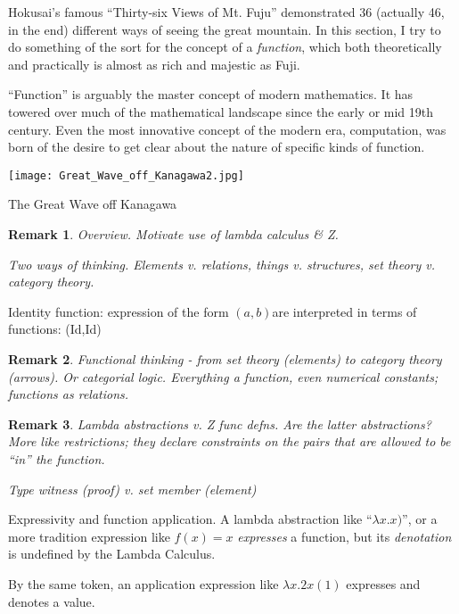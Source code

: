\documentclass[12pt]{tufte-handout}
\numberwithin{equation}{subsection}
\numberwithin{equation}{subsection}
\newtheorem{remark}{Remark}
\newcommand\ab{\((a,b)\)}
\begin{document}
  Hokusai's famous ``Thirty-six Views of Mt. Fuju'' demonstrated 36
  (actually 46, in the end) different ways of seeing the great
  mountain.  In this section, I try to do something of the sort for
  the concept of a \textit{function}, which both theoretically and
  practically is almost as rich and majestic as Fuji.

  ``Function'' is arguably the master concept of modern mathematics.
  It has towered over much of the mathematical landscape since the
  early or mid 19th century.  Even the most innovative concept of the
  modern era, computation, was born of the desire to get clear about
  the nature of specific kinds of function.


  \begin{marginfigure}%
    \centering
    \texttt{[image: Great\_Wave\_off\_Kanagawa2.jpg]}
    \caption{The Great Wave off Kanagawa}
  \end{marginfigure}

  \begin{remark}
    Overview.  Motivate use of lambda calculus \& Z.

    Two ways of thinking.  Elements v. relations, things v. structures,
    set theory v. category theory.
  \end{remark}

  Identity function: expression of the form \ab are interpreted in terms
  of functions: (Id,Id)

  \begin{remark}
    Functional thinking - from set theory (elements) to category theory
    (arrows).  Or categorial logic.  Everything a function, even
    numerical constants; functions as relations.
  \end{remark}

  \begin{remark}
    Lambda abstractions v. Z func defns.  Are the latter abstractions?
    More like restrictions; they declare constraints on the pairs that
    are allowed to be ``in'' the function.

    Type witness (proof) v. set member (element)
  \end{remark}

  Expressivity and function application.  A lambda abstraction like
  ``\(\lambda x.x)\)'', or a more tradition expression like \(f(x) = x\)
  \textit{expresses} a function, but its \textit{denotation} is
  undefined by the Lambda Calculus.

  By the same token, an application expression like \(\lambda x.2x(1)\)
  expresses and denotes a value.
\end{document}
